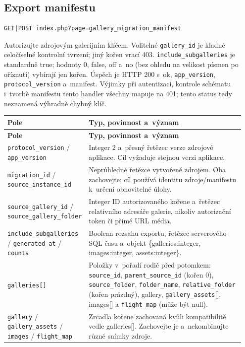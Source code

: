 \documentclass[11pt,a4paper]{article}
\newcommand{\codeword}[1]{\nolinkurl{#1}}
\begin{document}
\subsection{\texorpdfstring{Export manifestu}{Export manifestu}}

\label{api352:migration-manifest}

\begin{lstlisting}[language={}]
GET|POST index.php?page=gallery_migration_manifest
\end{lstlisting}

Autorizujte zdrojovým galerijním klíčem. Volitelné \codeword{gallery_id} je kladné
celočíselné kontrolní tvrzení; jiný kořen vrací 403. \codeword{include_subgalleries} je
standardně true; hodnoty 0, false, off a~no (bez ohledu na velikost písmen po oříznutí)
vybírají jen kořen. Úspěch je HTTP 200 s~ok, \codeword{app_version},
\codeword{protocol_version} a~manifest. Výjimky při autentizaci, kontrole schématu i~tvorbě
manifestu tento handler všechny mapuje na 401; tento status tedy neznamená výhradně chybný
klíč.

\begin{longtable}{@{}>{\RaggedRight\arraybackslash}p{0.28\linewidth}>{\RaggedRight\arraybackslash}p{0.67\linewidth}@{}}
\toprule
\textbf{Pole} & \textbf{Typ, povinnost a~význam} \\
\midrule
\endfirsthead
\toprule
\textbf{Pole} & \textbf{Typ, povinnost a~význam} \\
\midrule
\endhead
\bottomrule
\endfoot
\codeword{protocol_version} / \codeword{app_version} & Integer 2 a~přesný řetězec verze
zdrojové aplikace. Cíl vyžaduje stejnou verzi aplikace. \\
\codeword{migration_id} / \codeword{source_instance_id} & Neprůhledné řetězce vytvořené
zdrojem. Oba zachovejte; cíl používá identitu zdroje/manifestu k~určení obnovitelné úlohy.
\\
\codeword{source_gallery_id} / \codeword{source_gallery_folder} & Integer ID autorizovaného
kořene a~řetězec relativního adresáře galerie, nikoliv autorizační token či přímé URL média.
\\
\codeword{include_subgalleries} / \codeword{generated_at} / \codeword{counts} & Boolean
rozsahu exportu, řetězec serverového SQL času a~objekt \{galleries:integer, images:integer,
assets:integer\}. \\
\codeword{galleries[]} & Položky v~pořadí rodič před potomkem: \codeword{source_id},
\codeword{parent_source_id} (kořen 0), \codeword{source_folder}, \codeword{folder_name},
\codeword{relative_folder} (kořen prázdný), gallery, \codeword{gallery_assets}[], images[] a
\codeword{flight_map} (může být null). \\
\codeword{gallery} / \codeword{gallery_assets} / \codeword{images} / \codeword{flight_map} &
Zrcadla kořene zachovaná kvůli kompatibilitě vedle galleries[]. Zachovejte je a~nekombinujte
různé snímky zdroje. \\
\end{longtable}
\end{document}

